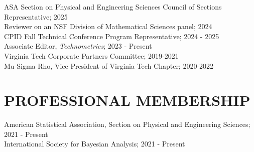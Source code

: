 \documentclass[margin,line,11pt]{res}
\begin{document}
\begin{resume}
ASA Section on Physical and Engineering Sciences Council of Sections Representative; 2025 \\
Reviewer on an NSF Division of Mathematical Sciences panel; 2024 \\
CPID Fall Technical Conference Program Representative; 2024 - 2025 \\
Associate Editor, {\it Technometrics}; 2023 - Present \\
Virginia Tech Corporate Partners Committee; 2019-2021 \\
Mu Sigma Rho, Vice President of Virginia Tech Chapter; 2020-2022

\medskip
\section{\bf PROFESSIONAL MEMBERSHIP}

American Statistical Association, Section on Physical and Engineering Sciences; 2021 - Present \\
International Society for Bayesian Analysis; 2021 - Present \\

\end{resume}
\end{document}
